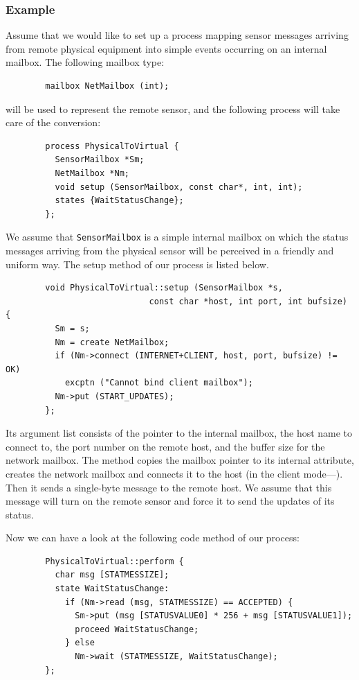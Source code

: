\subsubsection*{Example}

\noindent
Assume that we would like to set up a process mapping sensor messages arriving
from remote physical equipment into simple events occurring
on an internal mailbox.
The following mailbox type:
\begin{verbatim}
        mailbox NetMailbox (int);
\end{verbatim}
\noindent
will be used to represent the remote sensor, and the following process will
take care of the conversion:
\begin{verbatim}
        process PhysicalToVirtual {
          SensorMailbox *Sm;
          NetMailbox *Nm;
          void setup (SensorMailbox, const char*, int, int);
          states {WaitStatusChange};
        };
\end{verbatim}

We assume that {\tt SensorMailbox} is a simple internal mailbox on which
the status messages arriving from the physical sensor will be perceived in
a friendly and uniform way.
The setup method of our process is listed below.

\begin{verbatim}
        void PhysicalToVirtual::setup (SensorMailbox *s,
                             const char *host, int port, int bufsize) {
          Sm = s;
          Nm = create NetMailbox;
          if (Nm->connect (INTERNET+CLIENT, host, port, bufsize) != OK)
            excptn ("Cannot bind client mailbox");
          Nm->put (START_UPDATES);
        };
\end{verbatim}

\noindent
Its argument list consists of the pointer to the internal mailbox,
the host name to connect to, the port number
on the remote host, and the buffer size for the network mailbox.
The method copies the mailbox pointer to its internal attribute,
creates the network mailbox and connects it to the host (in the client
mode---).
Then it sends a single-byte message to the remote host.
We assume that this message will turn on the remote sensor and
force it to send the updates of its status.

Now we can have a look at the following code method of our process:
\begin{verbatim}
        PhysicalToVirtual::perform {
          char msg [STATMESSIZE];
          state WaitStatusChange:
            if (Nm->read (msg, STATMESSIZE) == ACCEPTED) {
              Sm->put (msg [STATUSVALUE0] * 256 + msg [STATUSVALUE1]);
              proceed WaitStatusChange;
            } else
              Nm->wait (STATMESSIZE, WaitStatusChange);
        };
\end{verbatim}

